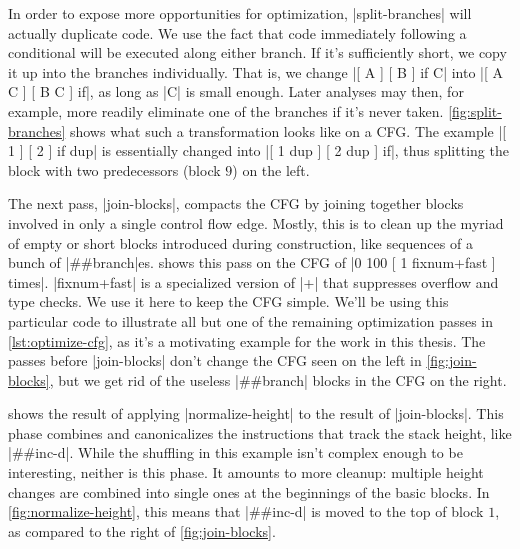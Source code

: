 
In order to expose more opportunities for optimization, \factor|split-branches|
will actually duplicate code.  We use the fact that code immediately following
a conditional will be executed along either branch.  If it's sufficiently
short, we copy it up into the branches individually.  That is, we change
%
\factor|[ A ] [ B ] if C|
%
into
%
\factor|[ A C ] [ B C ] if|,
%
as long as \factor|C| is small enough.  Later analyses may then, for example,
more readily eliminate one of the branches if it's never taken.
\vref{fig:split-branches} shows what such a transformation looks like on a
\gls{CFG}.  The example
%
\factor|[ 1 ] [ 2 ] if dup|
%
is essentially changed into
%
\factor|[ 1 dup ] [ 2 dup ] if|,
%
thus splitting the block with two predecessors (block $9$) on the left.


The next pass, \factor|join-blocks|, compacts the \gls{CFG} by joining together
blocks involved in only a single control flow edge.  Mostly, this is to clean
up the myriad of empty or short blocks introduced during construction, like
sequences of a bunch of \factor|##branch|es.   shows this
pass on the \gls{CFG} of
%
\factor|0 100 [ 1 fixnum+fast ] times|.
%
\factor|fixnum+fast| is a specialized version of \factor|+| that suppresses
overflow and type checks.  We use it here to keep the \gls{CFG} simple.  We'll
be using this particular code to illustrate all but one of the remaining
optimization passes in \vref{lst:optimize-cfg}, as it's a motivating example
for the work in this thesis.  The passes before \factor|join-blocks| don't
change the \gls{CFG} seen on the left in \vref{fig:join-blocks}, but we get rid
of the useless \factor|##branch| blocks in the \gls{CFG} on the right.


 shows the result of applying
\factor|normalize-height| to the result of \factor|join-blocks|.  This phase
combines and canonicalizes the instructions that track the stack height, like
\factor|##inc-d|.  While the shuffling in this example isn't complex enough to
be interesting, neither is this phase.  It amounts to more cleanup: multiple
height changes are combined into single ones at the beginnings of the basic
blocks.  In \vref{fig:normalize-height}, this means that \factor|##inc-d| is
moved to the top of block $1$, as compared to the right of
\vref{fig:join-blocks}.

